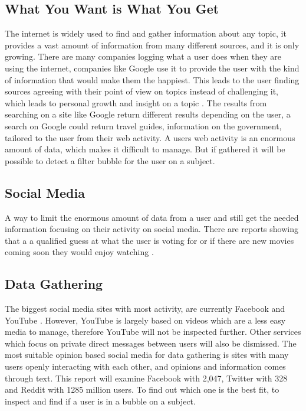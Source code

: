 \subsection{What You Want is What You Get}
The internet is widely used to find and gather information about any topic, it
provides a vast amount of information from many different sources, and it is
only growing. There are many companies logging what a user does when they are
using the internet, companies like Google use it to provide the user with the
kind of information that would make them the happiest. This leads to the user
finding sources agreeing with their point of view on topics instead of
challenging it, which leads to personal growth and insight on a topic
\citep{tedFilterBubble}. The results from searching on a site like Google return
different results depending on the user, a search on Google could return travel
guides, information on the government, tailored to the user from their web
activity. A users web activity is an enormous amount of data, which makes it
difficult to manage. But if gathered it will be possible to detect a filter
bubble for the user on a subject.

\subsection{Social Media}
A way to limit the enormous amount of data from a user and still get the needed
information  focusing on their activity on social
media.
There are reports showing that a  a qualified guess at what the user is voting for or if there
are new movies coming soon they would enjoy watching \citep{Personality}.

\subsection{Data Gathering}
The biggest social media sites with most activity, are currently Facebook and
YouTube \citep{SocialMediaStats}.
However, YouTube is largely based on videos which are a less easy media to
manage, therefore YouTube will not be inspected further. Other services which
focus on private direct messages between users will also be dismissed. The most
suitable opinion based social media for data gathering is sites with many users
openly interacting with each other, and opinions and information comes through
text. This report will examine Facebook with 2,047, Twitter with 328 and
Reddit with 1285 million users. To find out which one is the best fit, to inspect and
find if a user is in a bubble on a subject. 

